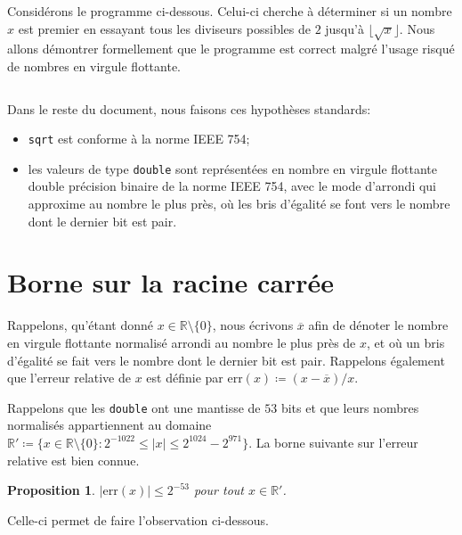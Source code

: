 \documentclass{article}
\newenvironment{code}{
  \smallskip\begin{tcolorbox}[colback=lightgray!8, breakable, sharp corners, before upper={\parindent15pt}, parbox=false, left=0pt, right=0pt, top=-1pt, bottom=-2pt, boxrule=0.75pt, enhanced, colframe=black!25]\vspace*{-4pt}
}{\vspace*{-5pt}\end{tcolorbox}\smallskip
}
\newcommand{\R}{\mathbb{R}}
\newcommand{\defeq}{\coloneqq}
\newtheorem{proposition}[theorem]{Proposition}
\begin{document}
Considérons le programme ci-dessous. Celui-ci cherche à déterminer si
un nombre $x$ est premier en essayant tous les diviseurs possibles de
$2$ jusqu'à $\lfloor \sqrt{x} \rfloor$. Nous allons démontrer
formellement que le programme est correct malgré l'usage risqué de
nombres en virgule flottante.

\begin{code}
  \inputminted{cpp}{code.cpp}
\end{code}

Dans le reste du document, nous faisons ces hypothèses standards:

\smallskip
\begin{itemize}
  \setlength\itemsep{3pt}

\item \og \texttt{sqrt} \fg{} est conforme à la norme
  IEEE 754;

\item les valeurs de type \texttt{double} sont représentées
  en nombre en virgule flottante double précision binaire de la norme
  IEEE 754, avec le mode d'arrondi qui approxime au nombre le plus
  près, où les bris d'égalité se font vers le nombre dont le dernier
  bit est pair.
\end{itemize}

\section{Borne sur la racine carrée}

Rappelons, qu'étant donné $x \in \R \setminus \{0\}$, nous écrivons
$\overline{x}$ afin de dénoter le nombre en virgule flottante
normalisé arrondi au nombre le plus près de $x$, et où un bris
d'égalité se fait vers le nombre dont le dernier bit est
pair. Rappelons également que l'erreur relative de $x$ est définie par
$\mathrm{err}(x) \defeq (x - \overline{x}) / x$.

Rappelons que les \texttt{double} ont une mantisse de $53$
bits et que leurs nombres normalisés appartiennent au domaine $\R'
\defeq \{x \in \R \setminus \{0\} : 2^{-1022} \leq |x| \leq 2^{1024} -
2^{971}\}$. La borne suivante sur l'erreur relative est bien connue.

\begin{proposition}\label{prop:err}
  $|\mathrm{err}(x)| \leq 2^{-53}$ pour tout $x \in \R'$.
\end{proposition}

Celle-ci permet de faire l'observation ci-dessous.
\end{document}
